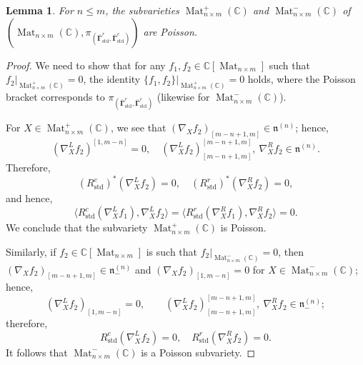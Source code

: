 \documentclass[11pt]{article}
\newcommand{\bbg}{\bar{\mathbf{\Gamma}}}
\newcommand{\std}{\mathrm{std}}
\DeclareMathOperator{\Mat}{Mat}
\newtheorem{lemma}[theorem]{Lemma}%
\theoremstyle{definition}\newtheorem{definition}[theorem]{Definition}
\theoremstyle{definition}\newtheorem{remark}[theorem]{Remark}
\theoremstyle{remark}
\numberwithin{equation}{section}
\begin{document}
\begin{lemma}\label{lm:MpmPoi}
    For $n \leq m$, 
    the subvarieties $\Mat_{n\times m}^+(\mathbb{C})$ and $\Mat_{n\times m}^-(\mathbb{C})$ of $(\Mat_{n\times m}(\mathbb{C}),\pi_{(\bbg^r_{\std},\bbg^c_{\std})})$ are Poisson. 
\end{lemma}
\begin{proof}
    We need to show that for any $f_1,f_2 \in \mathbb{C}[\Mat_{n\times m}]$ such that $f_2|_{\Mat_{n\times m}^+(\mathbb{C})} = 0$, the identity $\{f_1,f_2\}|_{\Mat_{n\times m}^+(\mathbb{C})} = 0$ holds, where the Poisson bracket corresponds to $\pi_{(\bbg^r_{\std},\bbg^c_{\std})}$ (likewise for $\Mat_{n\times m}^-(\mathbb{C})$).

    For $X \in \Mat_{n\times m}^+(\mathbb{C})$, we see that  $(\nabla_X f_2)_{[m-n+1,m]} \in \mathfrak{n}^{(n)}$; hence,
    \begin{equation*}
        (\nabla^L_Xf_2)^{[1,m-n]} = 0, \quad (\nabla^L_Xf_2)_{[m-n+1,m]}^{[m-n+1,m]}, \ \nabla^R_X f_2 \in \mathfrak{n}^{(n)}.
    \end{equation*}
    Therefore,
    \begin{equation*}
        (R^c_{\std})^*(\nabla_X^L f_2) = 0, \quad (R^r_{\std})^*(\nabla_X^R f_2) = 0,
    \end{equation*}
    and hence,
    \begin{equation*}
        \langle R^c_{\std}(\nabla^L_X f_1),\nabla^L_X f_2\rangle = \langle R^r_{\std}(\nabla^R_X f_1),\nabla^R_X f_2\rangle = 0.
    \end{equation*}
    We conclude that the subvariety $\Mat_{n\times m}^+(\mathbb{C})$ is Poisson.

    Similarly, if $f_2 \in \mathbb{C}[\Mat_{n\times m}]$ is such that $f_2|_{\Mat_{n\times m}^-(\mathbb{C})} = 0$, then $(\nabla_X f_2)_{[m-n+1,m]} \in \mathfrak{n}_-^{(n)}$ and $(\nabla_X f_2)_{[1,m-n]} = 0$ for $X \in \Mat_{n\times m}^-(\mathbb{C})$; hence,
    \begin{equation*}
        (\nabla^L_Xf_2)_{[1,m-n]} = 0, \qquad (\nabla^L_Xf_2)_{[m-n+1,m]}^{[m-n+1,m]}, \ \nabla^R_X f_2 \in \mathfrak{n}_-^{(n)};
    \end{equation*}
    therefore,
    \begin{equation*}
        R_{\std}^c(\nabla_X^L f_2) = 0, \quad R_{\std}^r(\nabla_X^R f_2) = 0.
    \end{equation*}
    It follows that $\Mat_{n\times m}^-(\mathbb{C})$ is a Poisson subvariety.
\end{proof}
\end{document}
